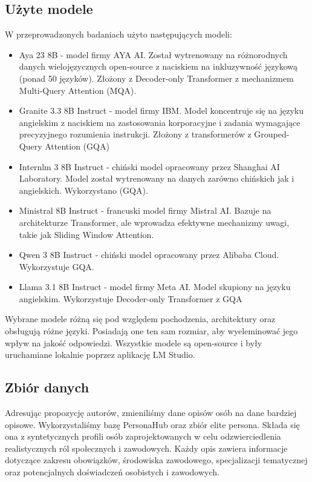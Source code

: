 \documentclass{article}
\begin{document}
\subsection{Użyte modele}
W przeprowadzonych badaniach użyto następujących modeli:
\begin{itemize}
    \item Aya 23 8B - model firmy AYA AI. Został wytrenowany na różnorodnych danych wielojęzycznych open-source z naciskiem na inkluzywność językową (ponad 50 języków). Złożony z Decoder-only Transformer z mechanizmem Multi-Query Attention (MQA).
    \item Granite 3.3 8B Instruct - model firmy IBM. Model koncentruje się na języku angielskim z naciskiem na zastosowania korporacyjne i zadania wymagające precyzyjnego rozumienia instrukcji. Złożony z transformerów z Grouped-Query Attention (GQA)
    \item Internlm 3 8B Instruct - chiński model opracowany przez Shanghai AI Laboratory. Model został wytrenowany na danych zarówno chińskich jak i angielskich. Wykorzystano (GQA).
    \item Ministral 8B Instruct - francuski model firmy Mistral AI. Bazuje na architekturze Transformer, ale wprowadza efektywne mechanizmy uwagi, takie jak Sliding Window Attention. 
    \item Qwen 3 8B Instruct - chiński model opracowany przez Alibaba Cloud. Wykorzystuje GQA.
    \item Llama 3.1 8B Instruct - model firmy Meta AI. Model skupiony na języku angielskim. Wykorzystuje Decoder-only Transformer z GQA \\
\end{itemize}
Wybrane modele różną się pod względem pochodzenia, architektury oraz obsługują różne języki.
Posiadają one ten sam rozmiar, aby wyeleminować jego wpływ na jakość odpowiedzi. Wszystkie modele są open-source i były uruchamiane lokalnie poprzez aplikację LM Studio.

\subsection{Zbiór danych}
Adresując propozycję autorów, zmieniliśmy dane opisów osób na dane bardziej opisowe. Wykorzystaliśmy bazę PersonaHub oraz zbiór elite persona. Składa się ona z syntetycznych profili osób zaprojektowanych w celu odzwierciedlenia realistycznych ról społecznych i zawodowych.
Każdy opis zawiera informacje dotyczące zakresu obowiązków, środowiska zawodowego, specjalizacji tematycznej oraz potencjalnych doświadczeń osobistych i zawodowych.
\end{document}
